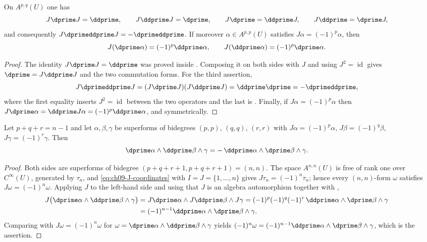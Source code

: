 \begin{lemma}
\label{lem:ch09-J-conjugation}
On $A^{p,q}(U)$ one has
\[
 J\dprime J=\ddprime,\qquad
 J\ddprime J=\dprime,\qquad
 J\dprime=\ddprime J,\qquad
 J\ddprime=\dprime J,
\]
and consequently $J\dprimeddprime J=-\dprimeddprime$.  If moreover
$\alpha\in A^{p,p}(U)$ satisfies $J\alpha=(-1)^p\alpha$, then
\[
 J(\dprime\alpha)=(-1)^p\ddprime\alpha,
 \qquad
 J(\ddprime\alpha)=(-1)^p\dprime\alpha .
\]
\end{lemma}

\begin{proof}
The identity $J\dprime J=\ddprime$ was proved inside
.  Composing it on both sides
with $J$ and using $J^2=\operatorname{id}$ gives $\dprime=J\ddprime J$ and the
two commutation forms.  For the third assertion,
\[
 J\dprimeddprime J
 =(J\dprime J)(J\ddprime J)
 =\ddprime\dprime
 =-\dprimeddprime ,
\]
where the first equality inserts $J^2=\operatorname{id}$ between the two
operators and the last is
.  Finally, if
$J\alpha=(-1)^p\alpha$ then
$J\dprime\alpha=\ddprime J\alpha=(-1)^p\ddprime\alpha$, and symmetrically.
\end{proof}

\begin{corollary}
\label{cor:ch09-symmetric-exchange}
Let $p+q+r=n-1$ and let $\alpha,\beta,\gamma$ be superforms of bidegrees
$(p,p)$, $(q,q)$, $(r,r)$ with $J\alpha=(-1)^p\alpha$,
$J\beta=(-1)^q\beta$, $J\gamma=(-1)^r\gamma$.  Then
\[
 \dprime\alpha\wedge\ddprime\beta\wedge\gamma
 =-\,\ddprime\alpha\wedge\dprime\beta\wedge\gamma .
\]
\end{corollary}

\begin{proof}
Both sides are superforms of bidegree
$(p+q+r+1,p+q+r+1)=(n,n)$.  The space $A^{n,n}(U)$ is free of rank one over
$C^\infty(U)$, generated by $\tau_n$, and
\eqref{eq:ch09-J-coordinates} with $I=J=\{1,\ldots,n\}$ gives
$J\tau_n=(-1)^n\tau_n$; hence every $(n,n)$-form $\omega$ satisfies
$J\omega=(-1)^n\omega$.  Applying $J$ to the left-hand side and using that
$J$ is an algebra automorphism together with
,
\[
\begin{aligned}
 J\bigl(\dprime\alpha\wedge\ddprime\beta\wedge\gamma\bigr)
 &=J\dprime\alpha\wedge J\ddprime\beta\wedge J\gamma
 =(-1)^{p}(-1)^{q}(-1)^{r}\,
   \ddprime\alpha\wedge\dprime\beta\wedge\gamma\\
 &=(-1)^{n-1}\ddprime\alpha\wedge\dprime\beta\wedge\gamma .
\end{aligned}
\]
Comparing with $J\omega=(-1)^n\omega$ for
$\omega=\dprime\alpha\wedge\ddprime\beta\wedge\gamma$ yields
$(-1)^n\omega=(-1)^{n-1}\ddprime\alpha\wedge\dprime\beta\wedge\gamma$, which
is the assertion.
\end{proof}

